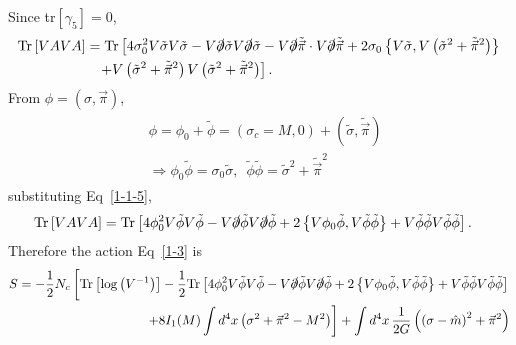 \documentclass[tightenlines,floatfix,nofootinbib,superscriptaddress,fleqn]{revtex4-2}
\begin{document}
Since tr$[\gamma_5]=0$,
\begin{align}\label{1-1-5}
  \begin{split}
    \mathrm{Tr}\left[VAVA\right]
    &=\mathrm{Tr}\left[4\sigma^2_0V\tilde{\sigma}V\tilde{\sigma}
    -V\slashed{\partial}\tilde{\sigma}V\slashed{\partial}\tilde{\sigma}
    -V\slashed{\partial}\tilde{\vec{\pi}}\cdot V\slashed{\partial}\tilde{\vec{\pi}}
    +2\sigma_0\left\{V\tilde{\sigma},V\left(\tilde{\sigma}^2+\tilde{\vec{\pi}}^2\right)
    \right\}
    \right.\\
    &\left.\,\,\,\,\,
    +V\left(\tilde{\sigma}^2+\tilde{\vec{\pi}}^2\right)V\left(\tilde{\sigma}^2
    +\tilde{\vec{\pi}}^2\right)
    \right].
  \end{split}
\end{align}
From $\phi=(\sigma,\vec{\pi})$,
\begin{align}\label{1-1-6}
  \begin{split}
    &\phi=\phi_0+\tilde{\phi}
    =(\sigma_c=M,0)+(\tilde{\sigma},\tilde{\vec{\pi}}) \\
    &\Longrightarrow \phi_0\tilde{\phi}=\sigma_0\tilde{\sigma},\,\,\,
    \tilde{\phi}\tilde{\phi}=\tilde{\sigma}^2+\tilde{\vec{\pi}}^2
  \end{split}
\end{align}
substituting Eq~\eqref{1-1-5},
\begin{align}\label{1-1-7}
  \begin{split}
    \mathrm{Tr}\left[VAVA\right]
    &=\mathrm{Tr}\left[
    4\phi_0^2V\tilde{\phi}V\tilde{\phi}
    -V\slashed{\partial}\tilde{\phi} 
     V\slashed{\partial}\tilde{\phi}
    +2\left\{V\phi_0\tilde{\phi},V\tilde{\phi}\tilde{\phi}
    \right\}
    +V\tilde{\phi}\tilde{\phi}V\tilde{\phi}\tilde{\phi}
    \right].
  \end{split}
\end{align}
Therefore the action Eq~\eqref{1-3} is
\begin{align}\label{1-1-8}
  \begin{split}
    S=-\frac{1}{2}N_c\left[\mathrm{Tr}
    \left[\log\left(V^{-1}\right)\right]
    -\frac{1}{2}\mathrm{Tr}\left[
      4\phi_0^2V\tilde{\phi}V\tilde{\phi}
      -V\slashed{\partial}\tilde{\phi}
       V\slashed{\partial}\tilde{\phi}
      +2\left\{V\phi_0\tilde{\phi},V\tilde{\phi}\tilde{\phi}
      \right\}
      +V\tilde{\phi}\tilde{\phi}V\tilde{\phi}\tilde{\phi}
      \right]\right.\\
      \,\,\,\,\,\left.
        +8I_1(M)\int d^4x\left(\sigma^2+\vec{\pi}^2-M^2\right)\right]
        +\int d^4x\,\frac{1}{2G}\left(\left(\sigma-\hat{m}\right)^2+\vec{\pi}^2\right)
      \end{split}
\end{align}
\end{document}

